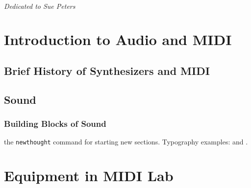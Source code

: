 \documentclass{tufte-book} %
\begin{document}
\cleardoublepage
~\vfill
\begin{doublespace}
\noindent\fontsize{18}{22}\selectfont\itshape
\nohyphenation
Dedicated to Sue Peters
\end{doublespace}
\vfill
\vfill

\justify
\cleardoublepage
\chapter{Introduction to Audio and MIDI} %

\section{Brief History of Synthesizers and MIDI}
\section{Sound}
\subsection{Building Blocks of Sound}


 the \texttt{newthought} command for starting new sections. Typography examples:  and .


\mainmatter


\chapter{Equipment in MIDI Lab}
\label{ch:1}

\end{document}
